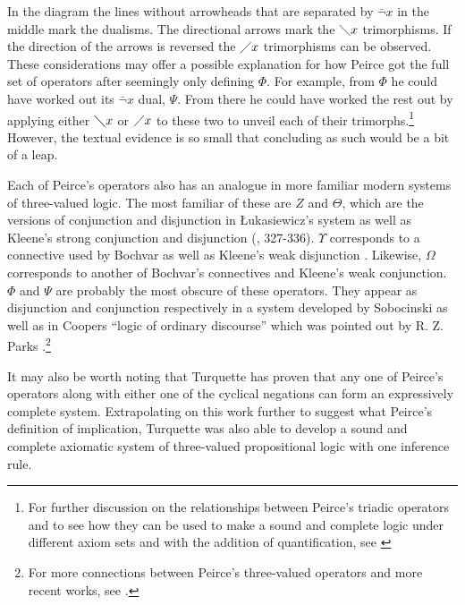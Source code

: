 In the diagram the lines without arrowheads that are separated by $\bar{\lnot}x$ in the middle mark the dualisms. The directional arrows mark the $\diagdown{x}$ trimorphisms. If the direction of the arrows is reversed the $\diagup{x}$ trimorphisms can be observed. These considerations may offer a possible explanation for how Peirce got the full set of operators after seemingly only defining $\Phi$. For example, from $\Phi$ he could have worked out its $\bar{\lnot}x$ dual, $\Psi$. From there he could have worked the rest out by applying either $\diagdown{x}$ or $\diagup{x}$ to these two to unveil each of their trimorphs.\footnote{For further discussion on the relationships between Peirce's triadic operators and to see how they can be used to make a sound and complete logic under different axiom sets and with the addition of quantification, see \cite{turquette_peirces_1967, turquette_storrs_1968, turquette_peirces_1969, turquette_minimal_1976, turquette_alternative_1978, turquette_quantification_1981, turquette_defining_1988}} However, the textual evidence is so small that concluding as such would be a bit of a leap.

Each of Peirce's operators also has an analogue in more familiar modern systems of three-valued logic. The most familiar of these are $Z$ and $\Theta$, which are the versions of conjunction and disjunction in Łukasiewicz's system as well as Kleene's strong conjunction and disjunction (\citeyear{kleene_introduction_1952}, 327-336). $\Upsilon$ corresponds to a connective used by Bochvar as well as Kleene's weak disjunction \citep{bochvar_three_1939}. Likewise, $\Omega$ corresponds to another of Bochvar's connectives and Kleene's weak conjunction. $\Phi$ and $\Psi$ are probably the most obscure of these operators. They appear as disjunction and conjunction respectively in a system developed by Sobocinski \citeyearpar{sobocinski_axiomatization_1952} as well as in Coopers ``logic of ordinary discourse'' \citeyearpar{cooper_propositional_1968} which was pointed out by R. Z. Parks \citeyearpar{parks_mystery_1971}.\footnote{For more connections between Peirce's three-valued operators and more recent works, see \cite{lane_2001}.}

It may also be worth noting that Turquette has proven that any one of Peirce's operators along with either one of the cyclical negations can form an expressively complete system. Extrapolating on this work further to suggest what Peirce's definition of implication, Turquette was also able to develop a sound and complete axiomatic system of three-valued propositional logic with one inference rule.

